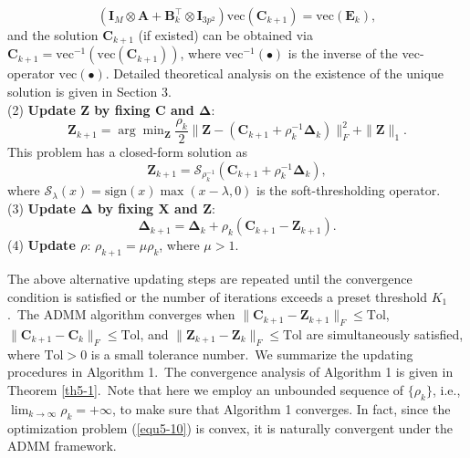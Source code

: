 \begin{equation}
\label{equ5-14}
(\bm{I}_{M}\otimes\bm{A}
+
\bm{B}_{k}^{\top}\otimes\bm{I}_{3p^2})\text{vec}(\bm{C}_{k+1})
=
\text{vec}(\bm{E}_{k}),
\end{equation}
and the solution $\bm{C}_{k+1}$ (if existed) can be obtained via $\bm{C}_{k+1}=\text{vec}^{-1}(\text{vec}(\bm{C}_{k+1}))$, where $\text{vec}^{-1}(\bullet)$ is the inverse of the vec-operator $\text{vec}(\bullet)$.
Detailed theoretical analysis on the existence of the unique solution is given in Section 3.
\\
(2) \textbf{Update $\bm{Z}$ by fixing $\bm{C}$ and $\bm{\Delta}$}:
\begin{equation}
\label{equ5-15}
\bm{Z}_{k+1}
=
\arg\min\nolimits_{\bm{Z}}\frac{\rho_{k}}{2}
\|\bm{Z} - (\bm{C}_{k+1}+\rho_{k}^{-1}\bm{\Delta}_{k})\|_{F}^{2}
+
\|\bm{Z}\|_{1}.
\end{equation}
This problem has a closed-form solution as 
\begin{equation}
\label{equ5-16}
\bm{Z}_{k+1}
=
\mathcal{S}_{\rho_{k}^{-1}}(\bm{C}_{k+1}+\rho_{k}^{-1}\bm{\Delta}_{k}),
\end{equation}
where $\mathcal{S}_{\lambda}(x) = \text{sign}(x)\max(x-\lambda, 0)$ is the soft-thresholding operator.
\\
(3) \textbf{Update $\bm{\Delta}$ by fixing $\bm{X}$ and $\bm{Z}$}:
\begin{equation}
\label{equ5-17}
\bm{\Delta}_{k+1}
=
\bm{\Delta}_{k} + \rho_{k}(\bm{C}_{k+1}-\bm{Z}_{k+1}).
\end{equation}
(4) \textbf{Update $\rho$}: $\rho_{k+1}= \mu\rho_{k}$, where $\mu>1$.

The above alternative updating steps are repeated until the convergence condition is satisfied or the number of iterations exceeds a preset threshold $K_{1}$.\ The ADMM algorithm converges when $\|\bm{C}_{k+1}-\bm{Z}_{k+1}\|_{F}\le \text{Tol}$, $\|\bm{C}_{k+1}-\bm{C}_{k}\|_{F}\le \text{Tol}$, and $\|\bm{Z}_{k+1}-\bm{Z}_{k}\|_{F}\le \text{Tol}$ are simultaneously satisfied, where $\text{Tol}>0$ is a small tolerance number.\ We summarize the updating procedures in Algorithm 1.\ The convergence analysis of Algorithm 1 is given in Theorem \ref{th5-1}.\ Note that here we employ an unbounded sequence of $\{\rho_{k}\}$, i.e., $\lim_{k \to \infty} \rho_{k}=+\infty$, to make sure that Algorithm 1 converges. In fact, since the optimization problem (\ref{equ5-10}) is convex, it is naturally convergent under the ADMM \cite{admm} framework.


